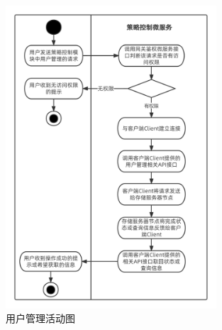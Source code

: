 \begin{figure}[htb]
    \centering
    \includegraphics[width=0.7\textwidth]{my_figures/chapter4/用户管理活动图.png}
    \caption{用户管理活动图}
    \label{fig:用户管理活动图}
\end{figure}




